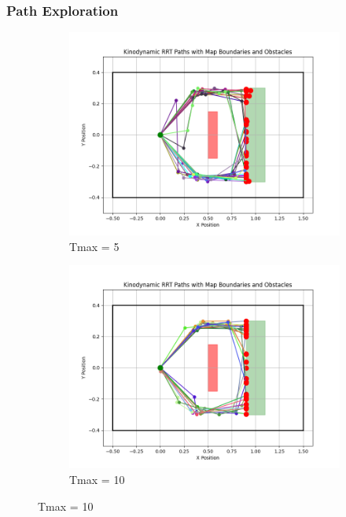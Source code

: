 \documentclass[12pt]{article}
\begin{document}
\subsubsection{Path Exploration}
\begin{figure}[h!]
    \centering
    \begin{subfigure}{0.45\textwidth}
        \centering
        \includegraphics[width=\textwidth]{./images/5.png}
        \caption{Tmax = 5}
        \label{fig:5.png}
    \end{subfigure}
    \hfill
    \begin{subfigure}{0.45\textwidth}
        \centering
        \includegraphics[width=\textwidth]{./images/10.png}
        \caption{Tmax = 10}
        \label{fig:10.png}
    \end{subfigure}
    

\end{figure}
\end{document}
